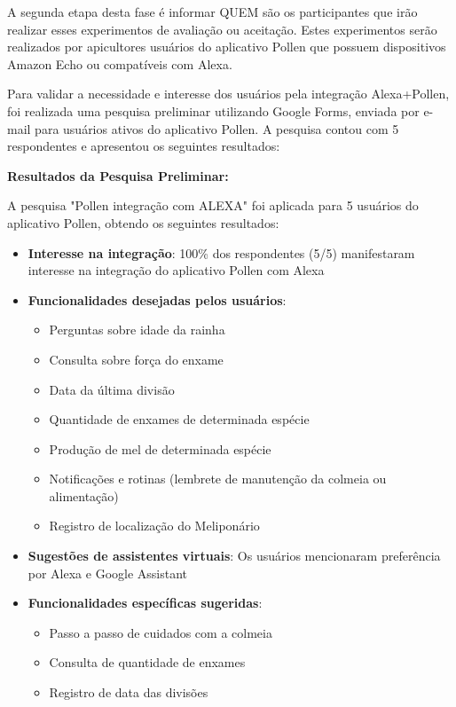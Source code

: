 A segunda etapa desta fase é informar QUEM são os participantes que irão realizar esses experimentos de avaliação ou aceitação. Estes experimentos serão realizados por apicultores usuários do aplicativo Pollen que possuem dispositivos Amazon Echo ou compatíveis com Alexa. 

Para validar a necessidade e interesse dos usuários pela integração Alexa+Pollen, foi realizada uma pesquisa preliminar utilizando Google Forms, enviada por e-mail para usuários ativos do aplicativo Pollen. A pesquisa contou com 5 respondentes e apresentou os seguintes resultados:

\textbf{Resultados da Pesquisa Preliminar:}

A pesquisa "Pollen integração com ALEXA" foi aplicada para 5 usuários do aplicativo Pollen, obtendo os seguintes resultados:

\begin{itemize}
    \item \textbf{Interesse na integração}: 100\% dos respondentes (5/5) manifestaram interesse na integração do aplicativo Pollen com Alexa
    \item \textbf{Funcionalidades desejadas pelos usuários}:
    \begin{itemize}
        \item Perguntas sobre idade da rainha
        \item Consulta sobre força do enxame
        \item Data da última divisão
        \item Quantidade de enxames de determinada espécie
        \item Produção de mel de determinada espécie
        \item Notificações e rotinas (lembrete de manutenção da colmeia ou alimentação)
        \item Registro de localização do Meliponário
    \end{itemize}
    \item \textbf{Sugestões de assistentes virtuais}: Os usuários mencionaram preferência por Alexa e Google Assistant
    \item \textbf{Funcionalidades específicas sugeridas}:
    \begin{itemize}
        \item Passo a passo de cuidados com a colmeia
        \item Consulta de quantidade de enxames
        \item Registro de data das divisões
    \end{itemize}
\end{itemize}

